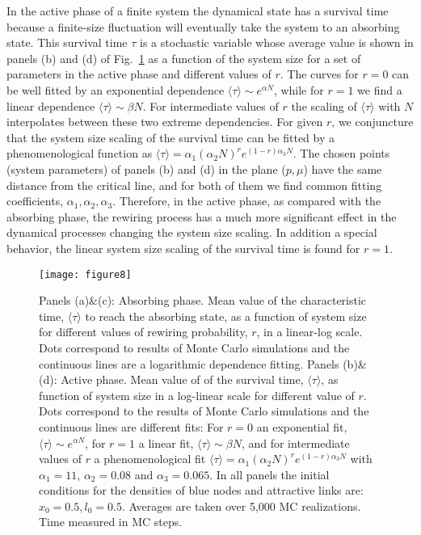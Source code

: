 \documentclass[aps,pre,notitlepage]{revtex4-1}
\begin{document}
In the active phase of a finite system the dynamical state has a survival time because a finite-size fluctuation will eventually take
the system to an absorbing state. This survival time $\tau$ is a stochastic variable whose average value is shown in panels (b) and (d) of Fig.~\ref{tau} as a function of the system size for a set of parameters in the active phase and different values of $r$.
The curves for $r=0$ can be well fitted by an exponential dependence $\langle\tau\rangle\sim e^{\alpha N}$, while for $r=1$ we find a linear dependence $\langle\tau\rangle\sim \beta N$. For intermediate values of $r$ the scaling of $\langle\tau\rangle$ with $N$ interpolates between these two extreme dependencies. For given $r$, we conjuncture that the system size scaling of the survival time can be fitted by a phenomenological function as $\langle\tau\rangle= \alpha_1 (\alpha_2 N)^{r}e^{(1-r)\alpha_3 N}$. The chosen points (system parameters) of panels (b) and (d) in the plane ($p,\mu$) have the same distance from the critical line, and for both of them we find common fitting coefficients, $\alpha_1,\alpha_2,\alpha_3$. Therefore, in the active phase, as compared with the absorbing phase, the rewiring process has a much more significant effect in the dynamical processes changing the system size scaling. In addition a special behavior, the linear system size scaling of the survival time is found for $r=1$.
\begin{figure}[]
 \centering
 \texttt{[image: figure8]}
\caption{Panels (a)\&(c): Absorbing phase. Mean value of the characteristic time, $\langle\tau\rangle$ to reach the absorbing state, as a function of system size for different values of rewiring probability, $r$, in a linear-log scale. Dots correspond to results of Monte Carlo simulations and the continuous lines are a logarithmic dependence fitting. Panels (b)\&(d): Active phase. Mean value of of the survival time, $\langle\tau\rangle$, as function of system size in a log-linear scale for different value of $r$. Dots correspond to the results of Monte Carlo simulations and the continuous lines are different fits: For $r=0$ an exponential fit, $\langle\tau\rangle\sim e^{\alpha N}$, for $r=1$ a linear fit, $\langle\tau\rangle\sim \beta N$, and for intermediate values of $r$ a phenomenological fit $\langle\tau\rangle= \alpha_1 (\alpha_2 N)^{r}e^{(1-r)\alpha_3 N}$ with $\alpha_1=11$, $\alpha_2=0.08$ and $\alpha_3=0.065$. In all panels the initial conditions for the densities of blue nodes and attractive links are: $x_0=0.5,l_0=0.5$. Averages are taken over 5,000 MC realizations. Time measured in MC steps.}
\label{tau}
\end{figure}
\end{document}
